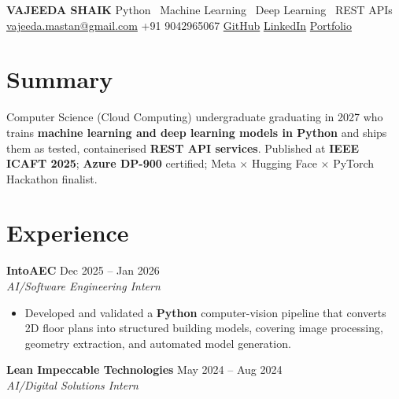 \documentclass[11pt]{extarticle}
\begin{document}

\noindent
{\LARGE\textbf{VAJEEDA SHAIK}}
\hfill
Python \textbar\ Machine Learning \textbar\ Deep Learning \textbar\ REST APIs
\\[4pt]

\small
\faEnvelope\;
\href{mailto:vajeeda.mastan@gmail.com}{vajeeda.mastan@gmail.com}
\quad\textbar\quad
\faPhone\; +91 9042965067
\quad\textbar\quad
\faGithub\;
\href{https://github.com/vajeedashaik}{GitHub}
\quad\textbar\quad
\faLinkedin\;
\href{https://www.linkedin.com/in/vajeeda-shaik-344774279}{LinkedIn}
\quad\textbar\quad
\faGlobe\;
\href{https://shaikvajeeda-portfolio.vercel.app}{Portfolio}

\normalsize


\section*{Summary}

Computer Science (Cloud Computing) undergraduate graduating in 2027 who trains
\textbf{machine learning and deep learning models in Python} and ships them as
tested, containerised \textbf{REST API services}. Published at \textbf{IEEE ICAFT 2025};
\textbf{Azure DP-900} certified; Meta $\times$ Hugging Face $\times$ PyTorch Hackathon finalist.


\section*{Experience}

\textbf{IntoAEC} \hfill Dec 2025 -- Jan 2026 \\
\textit{AI/Software Engineering Intern}

\begin{itemize}
    \item Developed and validated a \textbf{Python} computer-vision pipeline that converts 2D floor plans into structured building models, covering image processing, geometry extraction, and automated model generation.
\end{itemize}

\vspace{3pt}

\textbf{Lean Impeccable Technologies} \hfill May 2024 -- Aug 2024 \\
\textit{AI/Digital Solutions Intern}
\end{document}
